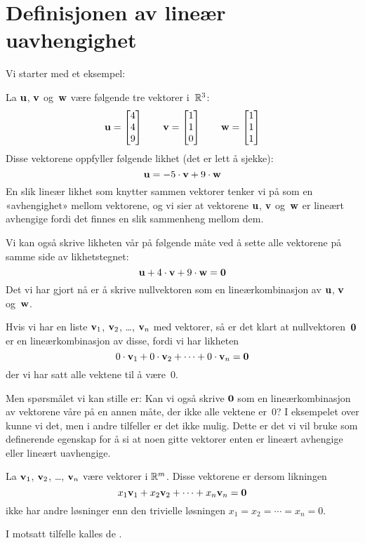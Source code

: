 

\label{ch:linear-uavhengighet}


\section*{Definisjonen av lineær uavhengighet}

Vi starter med et eksempel:

\begin{ex}
La $\mathbf{u}$, $\mathbf{v}$ og~$\mathbf{w}$ være følgende tre vektorer i~$\mathbb{R}^3$:
\[
\mathbf{u} = \begin{bmatrix} 4 \\ 4 \\ 9 \end{bmatrix}
\qquad
\mathbf{v} = \begin{bmatrix} 1 \\ 1 \\ 0 \end{bmatrix}
\qquad
\mathbf{w} = \begin{bmatrix} 1 \\ 1 \\ 1 \end{bmatrix}
\]
Disse vektorene oppfyller følgende likhet (det er lett å sjekke):
\[
\mathbf{u} = -5 \cdot \mathbf{v} + 9 \cdot \mathbf{w}
\]
En slik lineær likhet som knytter sammen vektorer tenker vi på som en
«avhengighet» mellom vektorene, og vi sier at vektorene $\mathbf{u}$,
$\mathbf{v}$ og~$\mathbf{w}$ er lineært avhengige fordi det finnes en slik
sammenheng mellom dem.

Vi kan også skrive likheten vår på følgende måte ved å sette alle
vektorene på samme side av likhetstegnet:
\[
\mathbf{u} + 4 \cdot \mathbf{v} + 9 \cdot \mathbf{w} = \mathbf{0}
\]
Det vi har gjort nå er å skrive nullvektoren som en lineærkombinasjon
av $\mathbf{u}$, $\mathbf{v}$ og~$\mathbf{w}$.  
\end{ex}

Hvis vi har en liste $\mathbf{v}_1$, $\mathbf{v}_2$, \ldots, $\mathbf{v}_n$ med
vektorer, så er det klart at nullvektoren~$\mathbf{0}$ er en
lineærkombinasjon av disse, fordi vi har likheten
\[
0 \cdot \mathbf{v}_1 + 0 \cdot \mathbf{v}_2 + \cdots + 0 \cdot \mathbf{v}_n = \mathbf{0}
\]
der vi har satt alle vektene til å være~$0$.

Men spørsmålet vi kan stille er: Kan vi også skrive $\mathbf{0}$ som en
lineærkombinasjon av vektorene våre på en annen måte, der ikke alle
vektene er~$0$?  I eksempelet over kunne vi det, men i andre tilfeller
er det ikke mulig.  Dette er det vi vil bruke som definerende egenskap
for å si at noen gitte vektorer enten er lineært avhengige eller
lineært uavhengige.

\begin{defn}
La $\mathbf{v}_1$, $\mathbf{v}_2$, \ldots, $\mathbf{v}_n$ være vektorer i $\mathbb{R}^m$.
Disse vektorene er  dersom likningen
\[
x_1 \mathbf{v}_1 + x_2 \mathbf{v}_2 + \cdots + x_n \mathbf{v}_n = \mathbf{0}
\]
ikke har andre løsninger enn den trivielle løsningen
$x_1 = x_2 = \cdots = x_n = 0$.

I motsatt tilfelle kalles de .
\end{defn}

